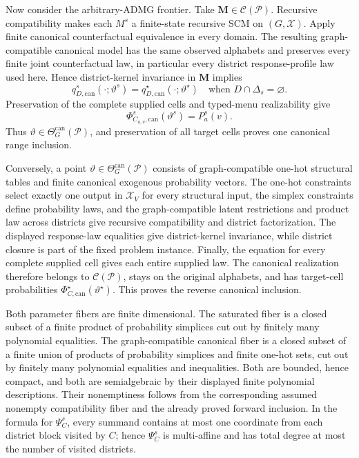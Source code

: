 Now consider the arbitrary-ADMG frontier. Take \(\mathbf M\in\mathcal C(\mathcal P)\). Recursive compatibility makes each \(M^s\) a finite-state recursive SCM on \((G,\mathcal X)\). Apply finite canonical counterfactual equivalence in every domain. The resulting graph-compatible canonical model has the same observed alphabets and preserves every finite joint counterfactual law, in particular every district response-profile law used here. Hence district-kernel invariance in \(\mathbf M\) implies
\[
q_{D,\mathrm{can}}^s(\cdot;\vartheta^s)
=q_{D,\mathrm{can}}^\star(\cdot;\vartheta^\star)
\quad\text{when }D\cap\Delta_s=\varnothing.
\]
Preservation of the complete supplied cells and typed-menu realizability give
\[
\Phi_{C_{a,v},\mathrm{can}}^s(\vartheta^s)=P_a^s(v).
\]
Thus \(\vartheta\in\Theta_G^{\mathrm{can}}(\mathcal P)\), and preservation of all target cells proves one canonical range inclusion.

Conversely, a point \(\vartheta\in\Theta_G^{\mathrm{can}}(\mathcal P)\) consists of graph-compatible one-hot structural tables and finite canonical exogenous probability vectors. The one-hot constraints select exactly one output in \(\mathcal X_V\) for every structural input, the simplex constraints define probability laws, and the graph-compatible latent restrictions and product law across districts give recursive compatibility and district factorization. The displayed response-law equalities give district-kernel invariance, while district closure is part of the fixed problem instance. Finally, the equation for every complete supplied cell gives each entire supplied law. The canonical realization therefore belongs to \(\mathcal C(\mathcal P)\), stays on the original alphabets, and has target-cell probabilities \(\Phi_{C,\mathrm{can}}^\star(\vartheta^\star)\). This proves the reverse canonical inclusion.

Both parameter fibers are finite dimensional. The saturated fiber is a closed subset of a finite product of probability simplices cut out by finitely many polynomial equalities. The graph-compatible canonical fiber is a closed subset of a finite union of products of probability simplices and finite one-hot sets, cut out by finitely many polynomial equalities and inequalities. Both are bounded, hence compact, and both are semialgebraic by their displayed finite polynomial descriptions. Their nonemptiness follows from the corresponding assumed nonempty compatibility fiber and the already proved forward inclusion. In the formula for \(\Psi_C^s\), every summand contains at most one coordinate from each district block visited by \(C\); hence \(\Psi_C^s\) is multi-affine and has total degree at most the number of visited districts.

